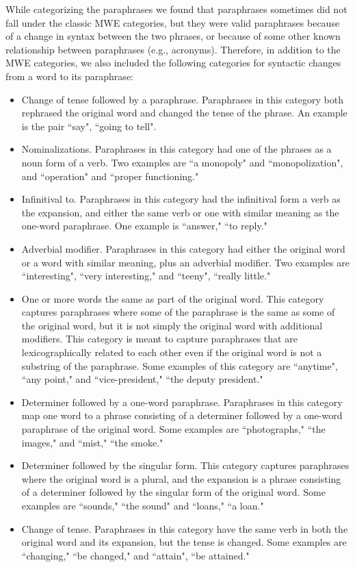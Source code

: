 \documentclass[11pt]{article}
\begin{document}
While categorizing the paraphrases we found that paraphrases sometimes did not fall under the classic MWE categories, but they were valid paraphrases because of a change in syntax between the two phrases, or because of some other known relationship between paraphrases (e.g., acronyms). Therefore, in addition to the MWE categories, we also included the following categories for syntactic changes from a word to its paraphrase: 
\begin{itemize}
\item Change of tense followed by a paraphrase. Paraphrases in this category both rephrased the original word and changed the tense of the phrase. An example is the pair ``say", ``going to tell". 

\item Nominalizations. Paraphrases in this category had one of the phrases as a noun form of a verb. Two examples are ``a monopoly" and ``monopolization", and ``operation" and  ``proper functioning." 

\item Infinitival to. Paraphrases in this category had the infinitival form a verb as the expansion, and either the same verb or one with similar meaning as the one-word paraphrase. One example is ``answer," ``to reply."

\item Adverbial modifier. Paraphrases in this category had either the original word or a word with similar meaning, plus an adverbial modifier. Two examples are ``interesting", ``very interesting," and ``teeny", ``really little."

\item One or more words the same as part of the original word. This category captures paraphrases where some of the paraphrase is the same as some of the original word, but it is not simply the original word with additional modifiers. This category is meant to capture paraphrases that are lexicographically related to each other even if the original word is not a substring of the paraphrase. Some examples of this category are ``anytime", ``any point," and ``vice-president," ``the deputy president."

\item Determiner followed by a one-word paraphrase. Paraphrases in this category map one word to a phrase consisting of a determiner followed by a one-word paraphrase of the original word. Some examples are ``photographs," ``the images," and ``mist," ``the smoke."

\item Determiner followed by the singular form. This category captures paraphrases where the original word is a plural, and the expansion is a phrase consisting of a determiner followed by the singular form of the original word. Some examples are ``sounds," ``the sound" and ``loans," ``a loan."

\item Change of tense. Paraphrases in this category have the same verb in both the original word and its expansion, but the tense is changed. Some examples are ``changing," ``be changed," and ``attain", ``be attained."
\end{itemize}
\end{document}
